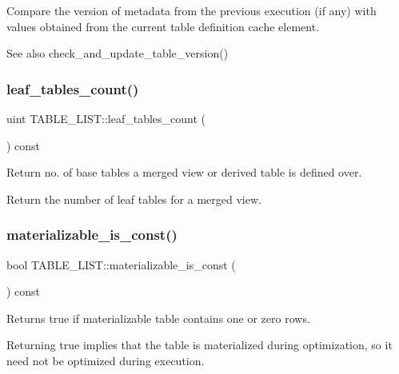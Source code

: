 Compare the version of metadata from the previous execution (if any) with values obtained from the current table definition cache element.

\begin{DoxySeeAlso}{See also}
check\+\_\+and\+\_\+update\+\_\+table\+\_\+version() 
\end{DoxySeeAlso}
\mbox{\label{structTABLE__LIST_a2f699410f2d5693c48cb5d525038f572}} 
\subsubsection{\texorpdfstring{leaf\+\_\+tables\+\_\+count()}{leaf\_tables\_count()}}
{\footnotesize\ttfamily uint T\+A\+B\+L\+E\+\_\+\+L\+I\+S\+T\+::leaf\+\_\+tables\+\_\+count (\begin{DoxyParamCaption}{ }\end{DoxyParamCaption}) const}



Return no. of base tables a merged view or derived table is defined over. 

Return the number of leaf tables for a merged view. \mbox{\label{structTABLE__LIST_a6e892515eb76fb15ac52f66ba51cc8fb}} 
\subsubsection{\texorpdfstring{materializable\+\_\+is\+\_\+const()}{materializable\_is\_const()}}
{\footnotesize\ttfamily bool T\+A\+B\+L\+E\+\_\+\+L\+I\+S\+T\+::materializable\+\_\+is\+\_\+const (\begin{DoxyParamCaption}{ }\end{DoxyParamCaption}) const}

\begin{DoxyReturn}{Returns}
true if materializable table contains one or zero rows.
\end{DoxyReturn}
Returning true implies that the table is materialized during optimization, so it need not be optimized during execution.

